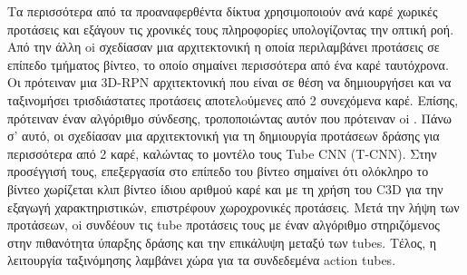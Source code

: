 Τα περισσότερα από τα προαναφερθέντα δίκτυα χρησιμοποιούν ανά καρέ χωρικές προτάσεις και εξάγουν 
τις χρονικές τους πληροφορίες υπολογίζοντας την οπτική ροή. Από την άλλη
oi \en \cite{DBLP:journals/corr/SahaSC17} \gr σχεδίασαν μια αρχιτεκτονική η οποία περιλαμβάνει προτάσεις σε επίπεδο τμήματος βίντεο, το οποίο σημαίνει  περισσότερα από ένα
καρέ ταυτόχρονα. Οι \en \cite{DBLP:journals/corr/SahaSC17} \gr  πρότειναν μια \en 3D-RPN \gr αρχιτεκτονική 
που είναι σε θέση να δημιουργήσει και να ταξινομήσει τρισδιάστατες προτάσεις   αποτελoύμενες από 2 συνεχόμενα  καρέ. Επίσης, πρότειναν έναν αλγόριθμο σύνδεσης,
τροποποιώντας αυτόν που πρότειναν oi \en \cite{DBLP:journals/corr/SahaSSTC16}\gr. Πάνω σ' αυτό, οι \en \cite{DBLP:journals/corr/HouCS17} \gr  σχεδίασαν μια αρχιτεκτονική για τη δημιουργία
προτάσεων δράσης για περισσότερα από 2 καρέ, καλώντας το μοντέλο τους \en Tube CNN (T-CNN)\gr. Στην προσέγγισή τους, επεξεργασία στο επίπεδο του  βίντεο σημαίνει
ότι ολόκληρο το βίντεο χωρίζεται κλιπ βίντεο ίδιου αριθμού καρέ  και με τη χρήση
του \en C3D \gr για την εξαγωγή χαρακτηριστικών, επιστρέφουν  χωροχρονικές προτάσεις. Μετά την λήψη των 
προτάσεων, oi \en\cite{DBLP:journals/corr/HouCS17}  \gr συνδέουν τις \en tube \gr προτάσεις τους  με έναν αλγόριθμο στηριζόμενος
στην πιθανότητα ύπαρξης δράσης  και την επικάλυψη μεταξύ των \en tubes\gr. Τέλος, η λειτουργία ταξινόμησης λαμβάνει χώρα για τα συνδεδεμένα \en action tubes\gr.



% 